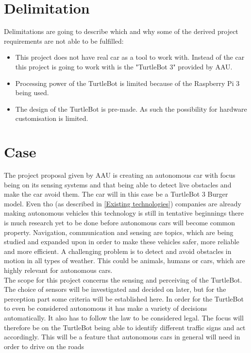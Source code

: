 



\section{Delimitation} 
Delimitations are going to describe which and why some of the derived project requirements are not able to be fulfilled:

\begin{itemize}

\item This project does not have real car as a tool to work with. Instead of the car this project is going to work with is the "TurtleBot 3" provided by AAU. %

\item Processing power of the TurtleBot is limited because of the Raspberry Pi 3 being used. 

\item The design of the TurtleBot is pre-made. As such the possibility for hardware customisation is limited.

\end{itemize}




\section{Case}
The project proposal given by AAU is creating an autonomous car with focus being on its sensing systems and that being able to detect live obstacles and make the car avoid them. The car will in this case be a TurtleBot 3 Burger model. Even tho (as described in \ref{Existing technologies}) companies are already making autonomous vehicles this technology is still in tentative beginnings there is much research yet to be done before autonomous cars will become common property. Navigation, communication and sensing are topics, which are being studied and expanded upon in order to make these vehicles safer, more reliable and more efficient. A challenging problem is to detect and avoid obstacles in motion in all types of weather. This could be animals, humans or cars, which are highly relevant for autonomous cars.\\
The scope for this project concerns the sensing and perceiving of the TurtleBot. The choice of sensors will be investigated and decided on later, but for the perception part some criteria will be established here. In order for the TurtleBot to even be considered autonomous it has make a variety of decisions automatically. It also has to follow the law to be considered legal. The focus will therefore be on the TurtleBot being able to identify different traffic signs and act accordingly. This will be a feature that autonomous cars in general will need in order to drive on the roads




